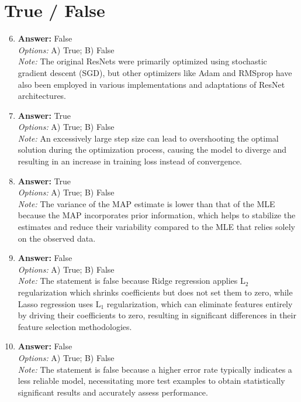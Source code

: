 \documentclass[12pt]{article}
\begin{document}
\section*{True / False}
\begin{enumerate}[label=\arabic*.]
\setcounter{enumi}{5}
\item \textbf{Answer:} False
\\ \textit{Options:} A) True; B) False
\\ \textit{Note:} The original ResNets were primarily optimized using stochastic gradient descent (SGD), but other optimizers like Adam and RMSprop have also been employed in various implementations and adaptations of ResNet architectures.
\item \textbf{Answer:} True
\\ \textit{Options:} A) True; B) False
\\ \textit{Note:} An excessively large step size can lead to overshooting the optimal solution during the optimization process, causing the model to diverge and resulting in an increase in training loss instead of convergence.
\item \textbf{Answer:} True
\\ \textit{Options:} A) True; B) False
\\ \textit{Note:} The variance of the MAP estimate is lower than that of the MLE because the MAP incorporates prior information, which helps to stabilize the estimates and reduce their variability compared to the MLE that relies solely on the observed data.
\item \textbf{Answer:} False
\\ \textit{Options:} A) True; B) False
\\ \textit{Note:} The statement is false because Ridge regression applies L$_{2}$ regularization which shrinks coefficients but does not set them to zero, while Lasso regression uses L$_{1}$ regularization, which can eliminate features entirely by driving their coefficients to zero, resulting in significant differences in their feature selection methodologies.
\item \textbf{Answer:} False
\\ \textit{Options:} A) True; B) False
\\ \textit{Note:} The statement is false because a higher error rate typically indicates a less reliable model, necessitating more test examples to obtain statistically significant results and accurately assess performance.
\end{enumerate}
\end{document}
